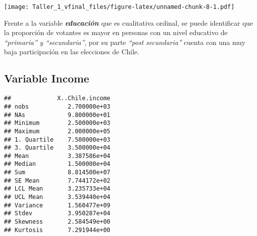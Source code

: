 \documentclass[
]{article}
\newenvironment{Shaded}{\begin{snugshade}}{\end{snugshade}}
\newcommand{\AttributeTok}[1]{\textcolor[rgb]{0.77,0.63,0.00}{#1}}
\newcommand{\CommentTok}[1]{\textcolor[rgb]{0.56,0.35,0.01}{\textit{#1}}}
\newcommand{\DecValTok}[1]{\textcolor[rgb]{0.00,0.00,0.81}{#1}}
\newcommand{\FloatTok}[1]{\textcolor[rgb]{0.00,0.00,0.81}{#1}}
\newcommand{\FunctionTok}[1]{\textcolor[rgb]{0.00,0.00,0.00}{#1}}
\newcommand{\NormalTok}[1]{#1}
\newcommand{\OtherTok}[1]{\textcolor[rgb]{0.56,0.35,0.01}{#1}}
\newcommand{\SpecialCharTok}[1]{\textcolor[rgb]{0.00,0.00,0.00}{#1}}
\newcommand{\StringTok}[1]{\textcolor[rgb]{0.31,0.60,0.02}{#1}}
\begin{document}
\texttt{[image: Taller\_1\_vfinal\_files/figure-latex/unnamed-chunk-8-1.pdf]}

Frente a la variable \textbf{\emph{educación}} que es cualitativa
ordinal, se puede identificar que la proporción de votantes es mayor en
personas con un nivel educativo de \emph{``primaria'' y ``secundaria''},
por su parte \emph{``post secundaria''} cuenta con una muy baja
participación en las elecciones de Chile.

\hypertarget{variable-income}{%
\subsection{\texorpdfstring{Variable
\textbf{Income}}{Variable Income}}\label{variable-income}}

\begin{Shaded}
\end{Shaded}

\begin{verbatim}
##             X..Chile.income
## nobs           2.700000e+03
## NAs            9.800000e+01
## Minimum        2.500000e+03
## Maximum        2.000000e+05
## 1. Quartile    7.500000e+03
## 3. Quartile    3.500000e+04
## Mean           3.387586e+04
## Median         1.500000e+04
## Sum            8.814500e+07
## SE Mean        7.744172e+02
## LCL Mean       3.235733e+04
## UCL Mean       3.539440e+04
## Variance       1.560477e+09
## Stdev          3.950287e+04
## Skewness       2.584549e+00
## Kurtosis       7.291944e+00
\end{verbatim}

\begin{Shaded}
\end{Shaded}
\end{document}
